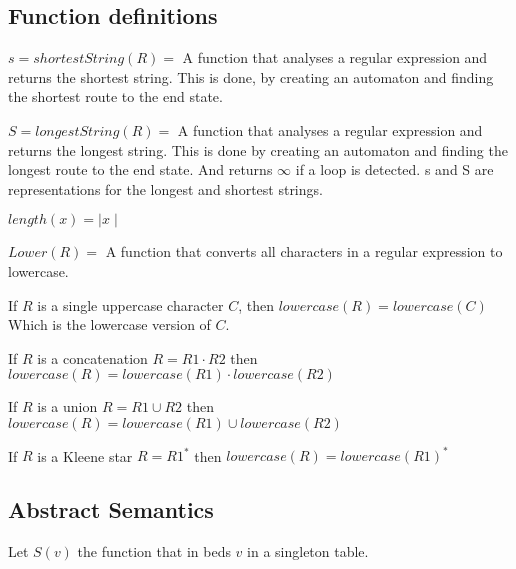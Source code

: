 \subsection{Function definitions} \label{subsec:function-definitions}

$s = shortestString(R) =$ A function that analyses a regular expression and returns the shortest string. This is done, by creating an automaton and finding the shortest route to the end state.

$S = longestString(R) =$ A function that analyses a regular expression and returns the longest string. This is done by creating an automaton and finding the longest route to the end state. And returns $\infty$ if a loop is detected.
s and S are representations for the longest and shortest strings.

$length(x) = \mid x \mid $

$Lower(R) =$ A function that converts all characters in a regular expression to lowercase.

If $R$ is a single uppercase character $C$, then $lowercase(R)=lowercase(C)$ Which is the lowercase version of $C$.

If $R$ is a concatenation $R=R1 \cdot R2$ then $lowercase(R)=lowercase(R1) \cdot lowercase(R2)$

If $R$ is a union $R=R1 \cup R2$ then $lowercase(R)=lowercase(R1) \cup lowercase(R2)$

If $R$ is a Kleene star $R=R1^*$ then $lowercase(R)=lowercase(R1)^*$

\subsection{Abstract Semantics}

Let $S(v)$ the function that in beds $v$ in a singleton table.



